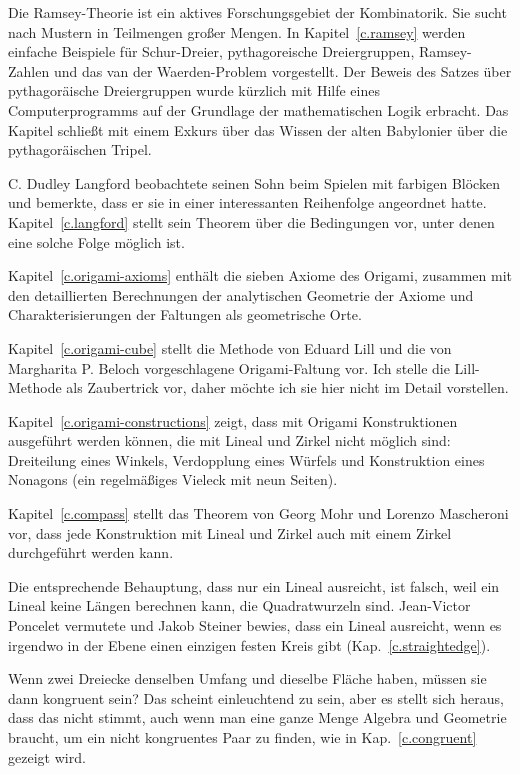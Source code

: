 Die Ramsey-Theorie ist ein aktives Forschungsgebiet der Kombinatorik. Sie sucht nach Mustern in Teilmengen großer Mengen. In Kapitel~\ref{c.ramsey} werden einfache Beispiele für Schur-Dreier, pythagoreische Dreiergruppen, Ramsey-Zahlen und das van der Waerden-Problem vorgestellt. Der Beweis des Satzes über pythagoräische Dreiergruppen wurde kürzlich mit Hilfe eines Computerprogramms auf der Grundlage der mathematischen Logik erbracht. Das Kapitel schließt mit einem Exkurs über das Wissen der alten Babylonier über die pythagoräischen Tripel.

C. Dudley Langford beobachtete seinen Sohn beim Spielen mit farbigen Blöcken und bemerkte, dass er sie in einer interessanten Reihenfolge angeordnet hatte. Kapitel~\ref{c.langford} stellt sein Theorem über die Bedingungen vor, unter denen eine solche Folge möglich ist.

Kapitel~\ref{c.origami-axioms} enthält die sieben Axiome des Origami, zusammen mit den detaillierten Berechnungen der analytischen Geometrie der Axiome und Charakterisierungen der Faltungen als geometrische Orte.

Kapitel~\ref{c.origami-cube} stellt die Methode von Eduard Lill und die von Margharita P. Beloch vorgeschlagene Origami-Faltung vor. Ich stelle die Lill-Methode als Zaubertrick vor, daher möchte ich sie hier nicht im Detail vorstellen.

Kapitel~\ref{c.origami-constructions} zeigt, dass mit Origami Konstruktionen ausgeführt werden können, die mit Lineal und Zirkel nicht möglich sind:  Dreiteilung eines Winkels, Verdopplung eines Würfels und Konstruktion eines Nonagons (ein regelmäßiges Vieleck mit neun Seiten).

Kapitel~\ref{c.compass} stellt das Theorem von Georg Mohr und Lorenzo Mascheroni vor, dass jede Konstruktion mit Lineal und Zirkel auch mit einem Zirkel durchgeführt werden kann.

Die entsprechende Behauptung, dass nur ein Lineal ausreicht, ist falsch, weil ein Lineal keine Längen berechnen kann, die Quadratwurzeln sind. Jean-Victor Poncelet vermutete und Jakob Steiner bewies, dass ein Lineal ausreicht, wenn es irgendwo in der Ebene einen einzigen festen Kreis gibt (Kap.~\ref{c.straightedge}).

Wenn zwei Dreiecke denselben Umfang und dieselbe Fläche haben, müssen sie dann kongruent sein? Das scheint einleuchtend zu sein, aber es stellt sich heraus, dass das nicht stimmt, auch wenn man eine ganze Menge Algebra und Geometrie braucht, um ein nicht kongruentes Paar zu finden, wie in Kap.~\ref{c.congruent} gezeigt wird.

